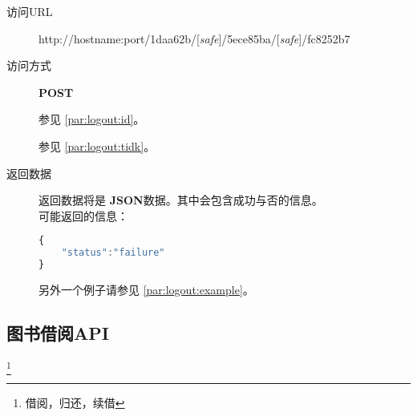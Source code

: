 \documentclass[UTF8]{article}
\def\safe{/[\textit{safe}]}
\def\POST{\colorbox[rgb]{0.77,0.53,0.97}{\textbf{POST}}}
\def\bfJSON{\textbf{JSON}}
\def\viaurl{\item[{\quad\colorbox[rgb]{0.47,0.88,0.89}{访问URL}}]}
\def\viareq#1{\item[{\quad\colorbox[rgb]{0.57,0.88,0.99}{访问方式}}] #1}
\def\rtdata{\item[{\quad\colorbox[rgb]{0.70,0.9,0.59}{返回数据}}]}
\begin{document}
        \begin{description}
            \viaurl http://hostname:port/1daa62b\safe/5ece85ba\safe/fc8252b7
            \viareq \POST

            参见 \ref{par:logout:id}。

            参见 \ref{par:logout:tidk}。


            \rtdata 返回数据将是 \bfJSON 数据。其中会包含成功与否的信息。
            \\可能返回的信息：
            \begin{lstlisting}[language=JavaScript]
{
    "status":"failure"
}
            \end{lstlisting}
            另外一个例子请参见 \ref{par:logout:example}。
        \end{description}


        \subsection{图书借阅API}
        \footnote{借阅，归还，续借}
\end{document}
